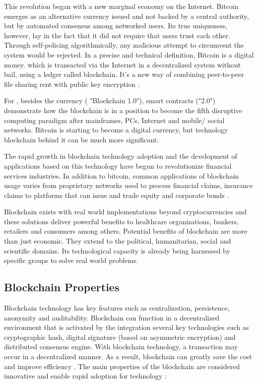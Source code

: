 This revolution began with a new marginal economy on the Internet. Bitcoin emerges as an alternative currency issued and not backed by a central authority, but by automated consensus among networked users. Its true uniqueness, however, lay in the fact that it did not require that users trust each other. Through self-policing algorithmically, any malicious attempt to circumvent the system would be rejected. In a precise and technical definition, Bitcoin is a digital money. which is transacted via the Internet in a decentralized system without bail, using a ledger called blockchain. It's a new way of combining peer-to-peer file sharing rent with public key encryption \cite{swan2015blockchain}.

For \cite{swan2015blockchain}, besides the currency ( "Blockchain 1.0"), smart contracts ("2.0") demonstrate how the blockchain is in a position to become the fifth disruptive computing paradigm after mainframes, PCs, Internet and mobile/ social networks. Bitcoin is starting to become a digital currency, but technology blockchain behind it can be much more significant.

The rapid growth in blockchain technology adoption and the development of applications based on this technology have begun to revolutionize financial services industries. In addition to bitcoin, common applications of blockchain usage varies from proprietary networks used to process financial claims, insurance claims to platforms that can issue and trade equity and corporate bonds \cite{michael2018blockchain}.

 Blockchain exists with real world implementations beyond cryptocurrencies and these solutions deliver powerful benefits to healthcare organizations, bankers, retailers and consumers among others. Potential benefits of blockchain are more than just economic. They extend to the political, humanitarian, social and scientific domains. Its technological capacity is already being harnessed by specific groups to solve real world problems.



\subsection{Blockchain Properties}\label{sec:propriedades}

Blockchain technology has key features such as centralization, persistence, anonymity and auditability. Blockchain can function in a decentralized environment that is activated by the integration several key technologies such as cryptographic hash, digital signature (based on asymmetric encryption) and distributed consensus engine. With blockchain technology, a transaction may occur in a decentralized manner. As a result, blockchain can greatly save the cost and improve efficiency \cite{zheng2016blockchain}. The main properties of the blockchain are considered innovative and enable rapid adoption for technology \cite{greve2018blockchain}:

